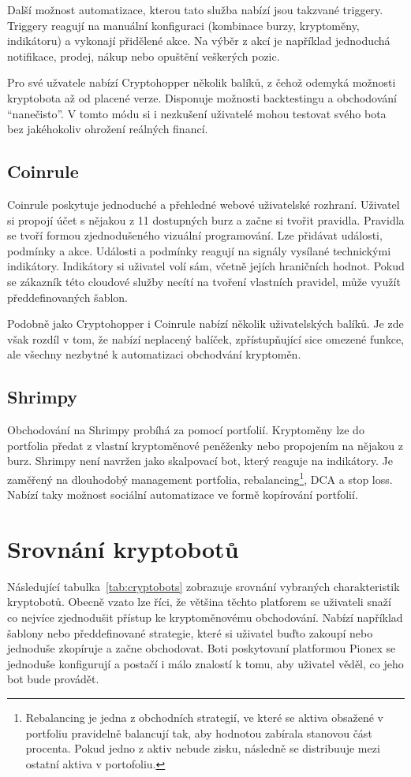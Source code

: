 Další možnost automatizace, kterou tato služba nabízí jsou takzvané triggery. Triggery reagují na manuální konfiguraci (kombinace burzy, kryptoměny, indikátoru) a vykonají
přidělené akce. Na výběr z akcí je například jednoduchá notifikace, prodej, nákup nebo opuštění veškerých pozic.

Pro své užvatele nabízí Cryptohopper několik balíků, z čehož odemyká možnosti kryptobota až od placené verze. Disponuje možnosti backtestingu a obchodování \enquote{nanečisto}.
V tomto módu si i nezkušení uživatelé mohou testovat svého bota bez jakéhokoliv ohrožení reálných financí.

\subsection{Coinrule}
Coinrule poskytuje jednoduché a přehledné webové uživatelské rozhraní. Uživatel si propojí účet s nějakou z 11 dostupných burz a začne si tvořit pravidla. Pravidla se tvoří
formou zjednodušeného vizuální programování. Lze přidávat události, podmínky a akce. Události a podmínky reagují na signály vysílané technickými indikátory. Indikátory
si uživatel volí sám, včetně jejích hraničních hodnot. Pokud se zákazník této cloudové služby necítí na tvoření vlastních pravidel, může využít předdefinovaných šablon.

Podobně jako Cryptohopper i Coinrule nabízí několik uživatelských balíků. Je zde však rozdíl v tom, že nabízí neplacený balíček, zpřístupňující sice omezené funkce, ale
všechny nezbytné k automatizaci obchodvání kryptoměn.


\subsection{Shrimpy}
Obchodování na Shrimpy probíhá za pomocí portfolií. Kryptoměny lze do portfolia předat z vlastní kryptoměnové peněženky nebo propojením na nějakou z burz. Shrimpy není navržen jako
skalpovací bot, který reaguje na indikátory. Je zaměřený na dlouhodobý management portfolia, rebalancing\footnote{Rebalancing je jedna z obchodních strategií, ve které
    se aktiva obsažené v portfoliu pravidelně balancují tak, aby hodnotou zabírala stanovou část procenta. Pokud jedno z aktiv nebude zisku, následně se distribuuje mezi ostatní
    aktiva v portofoliu.},
DCA a stop loss. Nabízí taky možnost sociální automatizace ve formě kopírování portfolií.


\section{Srovnání kryptobotů}
Následující tabulka~\ref{tab:cryptobots} zobrazuje srovnání vybraných charakteristik kryptobotů. Obecně vzato lze říci, že většina těchto platforem se uživateli snaží
co nejvíce zjednodušit přístup ke kryptoměnovému obchodování. Nabízí například šablony nebo předdefinované strategie, které si uživatel buďto zakoupí nebo jednoduše zkopíruje
a začne obchodovat. Boti poskytovaní platformou Pionex se jednoduše konfigurují a postačí i málo znalostí k tomu, aby uživatel věděl, co jeho bot bude provádět.

